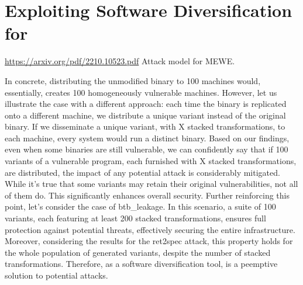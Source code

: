\chapter{Exploiting Software Diversification for \Wasm}
\label{method}







\label{usecasetime}
\url{https://arxiv.org/pdf/2210.10523.pdf} Attack model for MEWE.

In concrete, distributing the unmodified binary to 100 machines would, essentially, creates 100 homogeneously vulnerable machines.
However, let us illustrate the case with a different approach: each time the binary is replicated onto a different machine, we distribute a unique variant instead of the original binary. 
If we disseminate a unique variant, with X stacked transformations, to each machine, every system would run a distinct \wasm binary. 
Based on our findings, even when some binaries are still vulnerable, we can confidently say that if 100 variants of a vulnerable program, each furnished with X stacked transformations, are distributed, the impact of any potential attack is considerably mitigated.
While it's true that some variants may retain their original vulnerabilities, not all of them do. 
This significantly enhances overall security. 
Further reinforcing this point, let's consider the case of btb\_leakage. 
In this scenario, a suite of 100 variants, each featuring at least 200 stacked transformations, ensures full protection against potential threats, effectively securing the entire infrastructure.
Moreover, considering the results for the ret2spec attack, this property holds for the whole population of generated variants, despite the number of stacked transformations.
Therefore, \tool as a software diversification tool, is a peemptive solution to potential attacks.



